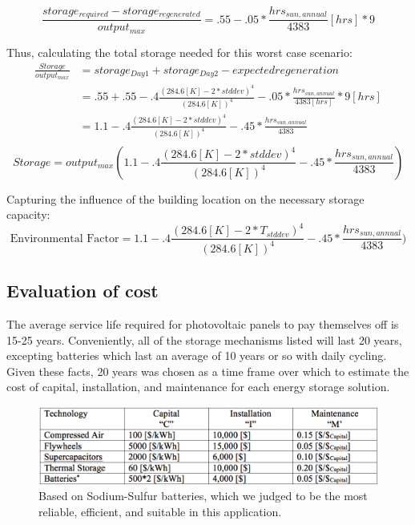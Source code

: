 \begin{equation}
\frac{storage_{required}-storage_{regenerated}}{output_{max}} =
.55-.05*\frac{hrs_{sun,annual}}{4383} [hrs]*9
\end{equation}

Thus, calculating the total storage needed for this worst case scenario:
\begin{equation}
\begin{aligned}
\frac{Storage}{output_{max}}&=storage_{Day1}+storage_{Day2}-expected
regeneration
\\
&=.55+.55-.4\frac{(284.6[K]-2*stddev)^4}{(284.6[K])^4}-.05*\frac{hrs_{sun,annual}}{4383
[hrs]}*9 [hrs] \\
&=1.1-.4\frac{(284.6[K]-2*stddev)^4}{(284.6
[K])^4}-.45*\frac{hrs_{sun,annual}}{4383}  \\
\end{aligned}
\end{equation}
\begin{equation}
Storage=output_{max}(1.1-.4\frac{(284.6[K]-2*stddev)^4}{(284.6
[K])^4}-.45*\frac{hrs_{sun,annual}}{4383})
\end{equation}

Capturing the influence of the building location on the necessary storage capacity:
\begin{equation}
\text{Environmental Factor}=1.1-.4\frac{(284.6[K]-2*T_{stddev})^4}{(284.6
[K])^4}-.45*\frac{hrs_{sun,annual}}{4383})
\end{equation}


\subsection{Evaluation of cost}

The average service life required for photovoltaic panels to pay themselves off
is 15-25 years. Conveniently, all of the storage mechanisms listed will last 20
years, excepting batteries which last an average of 10 years or so with daily
cycling. Given these facts, 20 years was chosen as a time frame over which to
estimate the cost of capital, installation, and maintenance for each energy
storage solution.

\begin{figure}
\begin{center}
\includegraphics[scale=0.3]{pics/PatrickTable0.png}
\caption{Based on Sodium-Sulfur batteries, which we judged to be the most
reliable, efficient, and suitable in this application.}
\label{patrickTable0}
\end{center}
\end{figure}

